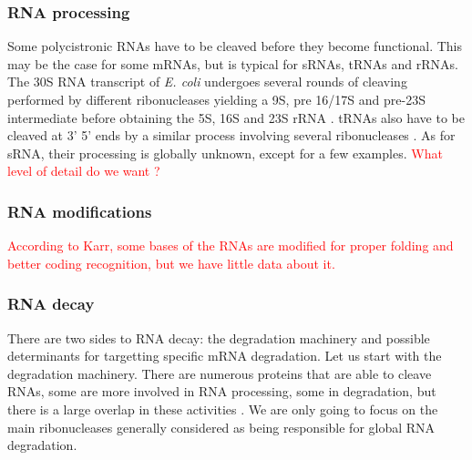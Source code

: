 
\subsubsection{RNA processing}

Some polycistronic RNAs have to be cleaved before they become functional. This may be the case for some mRNAs, but is typical for sRNAs, tRNAs and rRNAs. The 30S RNA transcript of \textit{E. coli} undergoes several rounds of cleaving performed by different ribonucleases yielding a 9S, pre 16/17S and pre-23S intermediate before obtaining the 5S, 16S and 23S rRNA \citep{arraiano_critical_2010}. tRNAs also have to be cleaved at 3' 5' ends by a similar process involving several ribonucleases \citep{arraiano_critical_2010}. As for sRNA, their processing is globally unknown, except for a few examples.
\textcolor{red}{What level of detail do we want ?}

\subsubsection{RNA modifications}

\textcolor{red}{According to Karr, some bases of the RNAs are modified for proper folding and better coding recognition, but we have little data about it.}

\subsubsection{RNA decay}

There are two sides to RNA decay: the degradation machinery and possible determinants for targetting specific mRNA degradation. Let us start with the degradation machinery. There are numerous proteins that are able to cleave RNAs, some are more involved in RNA processing, some in degradation, but there is a large overlap in these activities \citep{arraiano_critical_2010}. We are only going to focus on the main ribonucleases generally considered as being responsible for global RNA degradation.

